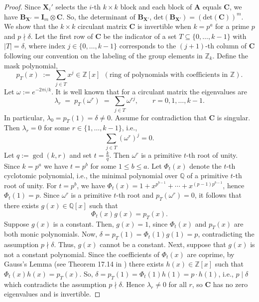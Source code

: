 \documentclass[journal,draftcls,onecolumn]{IEEEtran}
\theoremstyle{mystyle}
\newcommand{\bfC}{\mathbf{C}}
\newcommand{\bfX}{\mathbf{X}}
\newcommand{\bfA}{\mathbf{A}}
\newcommand{\bfI}{\mathbf{I}}
\begin{document}
\begin{proof}
Since $\bfX_i'$ selects the $i$-th $k\times k$ block and each block of $\bfA$
equals $\bfC$, we have $\mathbf{B}_{\bfX'} = \bfI_m \otimes \bfC$. So, the determinant of $\mathbf{B}_{\bfX'}$, $\text{det}(\mathbf{B}_{\bfX'}) = (\text{det} (\bfC))^m$.
We show that the $k\times k$ circulant matrix $\bfC$ is invertible when
$k=p^{a}$ for a prime $p$ and $p \nmid \delta$. Let the first row of $\bfC$ be the
indicator of a set $T\subseteq \{0, \dots, k-1 \}$ with $|T|=\delta$, where index $j \in \{0, \dots,k-1\}$ corresponds to the $(j+1)$-th column of $\bfC$ following our convention on the labeling of the group elements in $\mathbb{Z}_{k}$. Define the mask
polynomial,
\[
p_T(x)\;:=\;\sum_{j\in T} x^{j} \in \mathbb{Z}[x]~~ (\text{ring of polynomials with coefficients in $\mathbb{Z}$}).
\]
Let $\omega:=e^{-2\pi i/k}$. It is well known that for a circulant matrix the eigenvalues are
\begin{equation}\label{eq:eigs-circ}
\lambda_r \;=\; p_T(\omega^{r}) \;=\; \sum_{j\in T}\omega^{rj}, \qquad r=0,1,\dots,k-1.
\end{equation}
In particular, $\lambda_0=p_T(1)=\delta\neq 0$. Assume for contradiction that $\bfC$ is singular. Then $\lambda_r=0$ for some
$r\in\{1,\dots,k-1\}$, i.e.,
\begin{equation}\label{eq:vanish}
\sum_{j\in T} (\omega^{r})^{j}=0.
\end{equation}
Let $q:=\gcd(k,r)$ and set $t=\frac{k}{q}$. Then $\omega^{r}$ is a primitive $t$-th root
of unity. Since $k=p^{a}$ we have $t=p^{b}$ for some $1\le b\le a$. Let $\Phi_t(x)$ denote the $t$-th cyclotomic
polynomial, i.e., the minimal polynomial over $\mathbb{Q}$ of a primitive $t$-th root of unity. For $t=p^b$, we have $\Phi_{t}(x)=1+x^{p^{b-1}}+\cdots+x^{(p-1)p^{b-1}}$, hence
$\Phi_{t}(1)=p$.
Since $\omega^r$ is a primitive $t$-th root and $p_T(\omega^r)=0$, it follows that there exists $g(x) \in \mathbb{Q}[x]$ such that 
\[
\Phi_t(x)g(x) = p_T(x).
\]
Suppose $g(x)$ is a constant. Then, $g(x) = 1$, since $\Phi_t(x)$ and $p_T(x)$ are both monic polynomials. Now, $\delta = p_T(1) =\Phi_t(1)g(1) = p$, contradicting the
assumption $p\nmid \delta$. Thus, $g(x)$ cannot be a constant. Next, suppose that $g(x)$ is not a constant polynomial. Since the coefficients of $\Phi_t(x)$ are coprime, by Gauss's Lemma (see Theorem 17.14 in \cite{judson2021abstract}) there exists  $h(x)\in \mathbb{Z}[x]$ such that $\Phi_t(x)h(x) = p_T(x)$. So, $\delta = p_T(1) = \Phi_t(1) h(1) = p\cdot h(1)$, i.e., $p \mid \delta$ which contradicts the assumption $p \nmid \delta$. Hence $\lambda_r\neq 0$ for all $r$, so $\bfC$ has no zero eigenvalues and is invertible.  


\end{proof}
\end{document}
